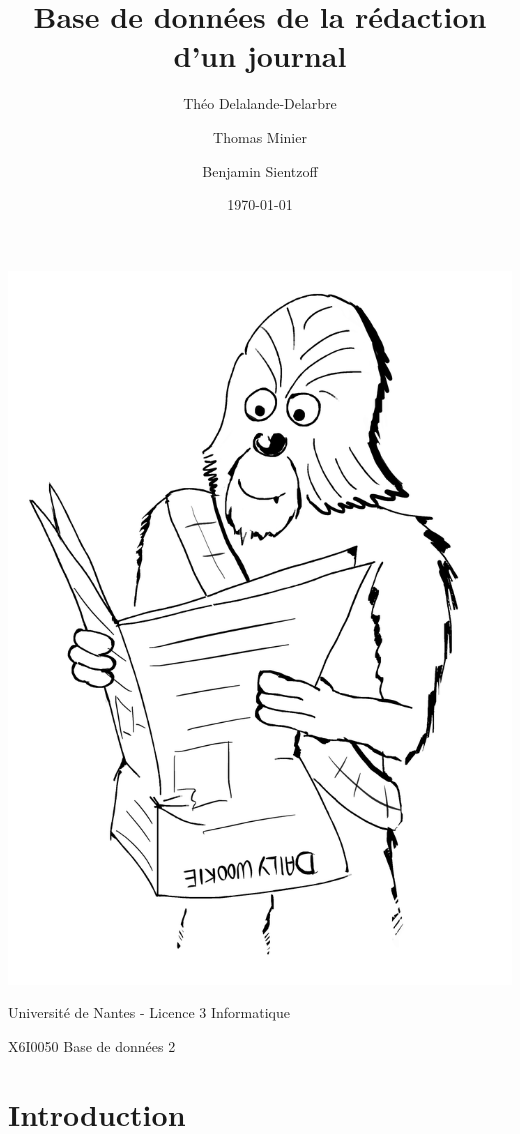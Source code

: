 \documentclass[a4paper,oneside]{article}
\title{Base de données de la rédaction d'un journal}
\author{Théo Delalande-Delarbre \and Thomas Minier \and Benjamin Sientzoff}
\date{\today}
\begin{document}
\maketitle
\begin{center}
    \includegraphics[scale=0.5]{images/wookie-hebdo.png}
\end{center}
\par{Université de Nantes - Licence 3 Informatique}
\par{\textsc{X6I0050} Base de données 2}

\newpage
\tableofcontents

\newpage

\section*{Introduction}
    
    
\end{document}
